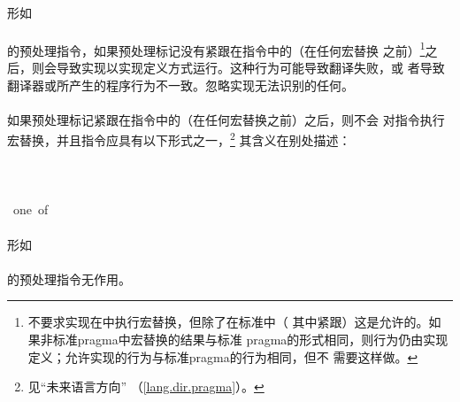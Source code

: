 {                                           
\semantic
\paragraph{}
形如                                                                          \\
\mbox{\hspace{4em} }           \\
的预处理指令，如果预处理标记没有紧跟在指令中的（在任何宏替换
之前）\footnote{不要求实现在中执行宏替换，但除了在标准中（
其中紧跟）这是允许的。如果非标准pragma中宏替换的结果与标准
pragma的形式相同，则行为仍由实现定义；允许实现的行为与标准pragma的行为相同，但不
需要这样做。}之后，则会导致实现以实现定义方式运行。这种行为可能导致翻译失败，或
者导致翻译器或所产生的程序行为不一致。忽略实现无法识别的任何。

\paragraph{}
如果预处理标记紧跟在指令中的（在任何宏替换之前）之后，则不会
对指令执行宏替换，并且指令应具有以下形式之一，\footnote{见``未来语言方向''
（\ref{lang.dir.pragma}）。} 其含义在别处描述：                               \\
\mbox{\hspace{4em} }         \\
\mbox{\hspace{4em} }         \\
\mbox{\hspace{4em} }   \\
\mbox{\hspace{4em} one of}                                 \\
\mbox{\hspace{10em}}


\semantic
\paragraph{}
形如                                                                          \\
\mbox{\hspace{4em}\tm{\#} }                                      \\
的预处理指令无作用。

}
